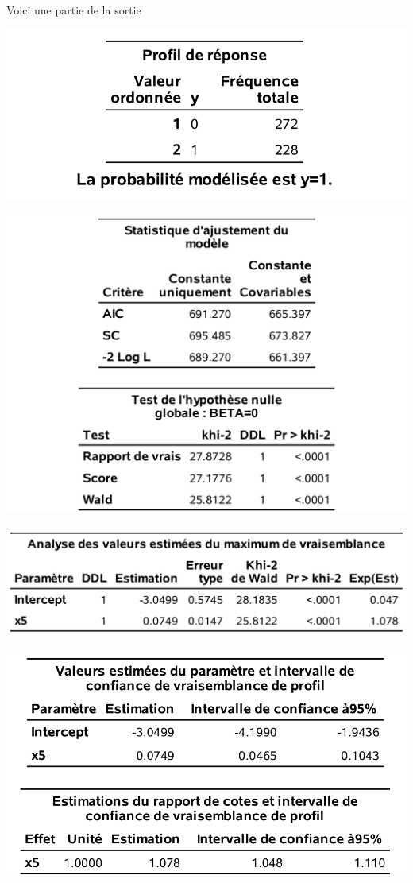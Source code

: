 \documentclass[
  11pt,
  letterpaper,
]{book}
\theoremstyle{definition}
\theoremstyle{definition}
\theoremstyle{definition}
\theoremstyle{remark}
\begin{document}
Voici une partie de la sortie

\begin{center}\includegraphics[width=0.63\linewidth]{figures/03-logistic-e1} \end{center}

\begin{center}\includegraphics[width=0.8\linewidth]{figures/03-logistic-e2} \end{center}

\begin{center}\includegraphics[width=0.8\linewidth]{figures/03-logistic-e3} \end{center}

\begin{center}\includegraphics[width=0.8\linewidth]{figures/03-logistic-e4} \end{center}
\end{document}
